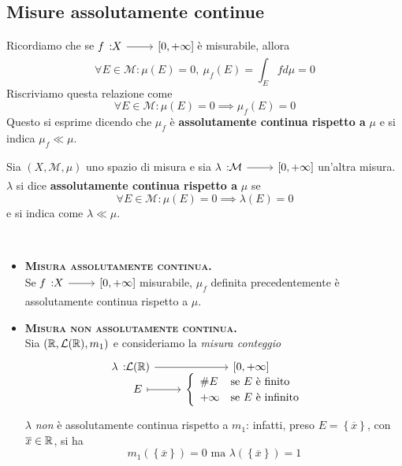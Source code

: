 \subsection{Misure assolutamente continue}
Ricordiamo che se $\funz{f}{X}{\left[0,+\infty\right]}$ è misurabile, allora
\begin{equation*}
		\forall E\in\mathcal{M}\colon \mu\left(E\right)=0,\ \mu_f\left(E\right)=\int_Efd\mu=0 
\end{equation*}
Riscriviamo questa relazione come
\begin{equation*}
	\forall E\in\mathcal{M}\colon\mu\left(E\right)=0\implies \mu_f\left(E\right)=0
\end{equation*}
Questo si esprime dicendo che $\mu_f$ è \textbf{assolutamente continua rispetto a} $\mu$ e si indica $\mu_f \ll \mu$.
\begin{define}
	Sia $\left(X,\mathcal{M},\mu\right)$ uno spazio di misura e sia $\funz{\lambda}{\mathcal{M}}{\left[0,+\infty\right]}$ un'altra misura. $\lambda$ si dice \textbf{assolutamente continua rispetto a }$\mu$ se
	\begin{equation}
		\forall E\in\mathcal{M}\colon \mu\left(E\right)=0\implies \lambda\left(E\right)=0
	\end{equation}
e si indica come $\lambda \ll \mu$.
\end{define}
\begin{examples}~{}
	\begin{itemize}
		\item \textsc{\textbf{Misura assolutamente continua.}}\\
		Se $\funz{f}{X}{\left[0,+\infty\right]}$ misurabile, $\mu_f$ definita precedentemente è assolutamente continua rispetto a $\mu$.
		\item \textsc{\textbf{Misura non assolutamente continua.}}\\
		Sia $\left(\mathbb{R},\mathcal{L}(\mathbb{R}),m_1\right)$ e consideriamo la \textit{misura conteggio}
		\begin{equation*}
			\funztot{\lambda}{\mathcal{L}(\realset)}{\left[0,+\infty\right]}{E}{\begin{cases}
					\begin{array}{ll}
						\# E&\text{se }E\text{ è finito}\\
						+\infty&\text{se }E\text{ è infinito}
					\end{array}
			\end{cases}}
		\end{equation*}
		$\lambda$ \textit{non} è assolutamente continua rispetto a $m_1$: infatti, preso $E=\left\{\overline{x}\right\}$, con $\overline{x}\in\mathbb{R}$, si ha
		\begin{equation*}
			m_1\left(\left\{\overline{x}\right\}\right)=0\text{ ma }\lambda\left(\left\{\overline{x}\right\}\right)=1
		\end{equation*}
	\end{itemize}
\end{examples}
